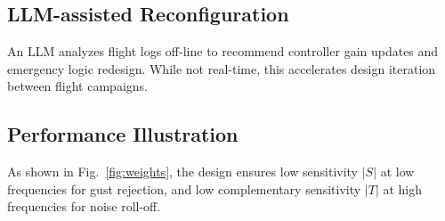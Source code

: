 \documentclass[conference]{IEEEtran}
\begin{document}
\subsection{LLM-assisted Reconfiguration}
An LLM analyzes flight logs off-line to recommend controller 
gain updates and emergency logic redesign. While not real-time, 
this accelerates design iteration between flight campaigns.  

\subsection{Performance Illustration}
As shown in Fig.~\ref{fig:weights}, the design ensures low sensitivity 
$|S|$ at low frequencies for gust rejection, and low complementary 
sensitivity $|T|$ at high frequencies for noise roll-off.  
\end{document}
